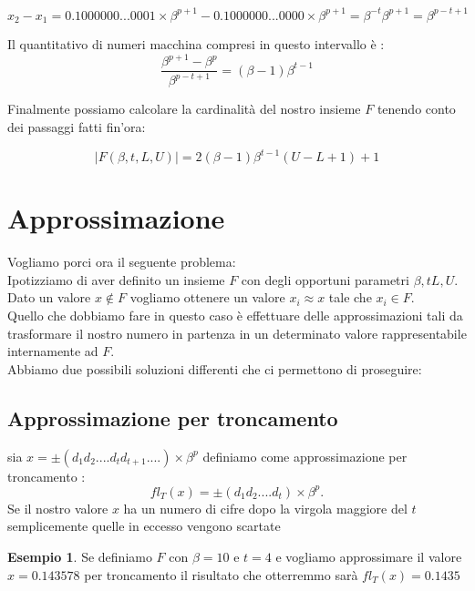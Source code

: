 \documentclass[12pt, a4paper]{book}
\theoremstyle{definition}
\newtheorem{exmp}{Esempio}[section]
\begin{document}
\begin{flushleft}
\[ x_{2} - x_{1} = 0.1000000...0001 \times \beta^{p+1} - 0.1000000...0000 \times \beta^{p+1} = \beta^{-t}\beta^{p+1} = \beta^{p-t+1} \]

Il quantitativo di numeri macchina compresi in questo intervallo è : 
\[ \frac{\beta^{p+1} - \beta^{p}}{\beta^{p-t+1}}  =(\beta-1)\beta^{t-1}\]

Finalmente possiamo calcolare la cardinalità del nostro insieme $F$ tenendo conto dei passaggi fatti fin'ora: 

\[ |F(\beta, t, L,U)| = 2(\beta-1)\beta^{t-1}(U-L+1) + 1\]


\end{flushleft}

\section{Approssimazione}
\begin{flushleft}
Vogliamo porci ora il seguente problema: \\
Ipotizziamo di aver definito un insieme $F$ con degli opportuni parametri $\beta, t L,U$. Dato un valore $x \notin F$ vogliamo ottenere un valore $x_{i} \approx x$ tale che $x_{i} \in F$.\\
Quello che dobbiamo fare in questo caso è effettuare delle approssimazioni tali da trasformare il nostro numero in partenza in un determinato valore rappresentabile internamente ad $F$. \\
Abbiamo due possibili soluzioni differenti che ci permettono di proseguire: 
\end{flushleft}

\subsection{Approssimazione per troncamento}
\begin{flushleft}
sia $x = \pm(d_{1}d_{2}....d_{t}d_{t+1}....)\times \beta^{p}$ definiamo come approssimazione per troncamento : 
\[ fl_{T}(x) = \pm(d_{1}d_{2}....d_{t})\times \beta^{p}.\]
Se il nostro valore $x$ ha un numero di cifre dopo la virgola maggiore del $t$ semplicemente quelle in eccesso vengono scartate

\begin{exmp}
Se definiamo $F$ con $\beta = 10 $ e $t = 4$ e vogliamo approssimare il valore $x = 0.143578$ per troncamento il risultato che otterremmo sarà $ fl_{T}(x) = 0.1435 $
\end{exmp}
\end{flushleft}
\end{document}
